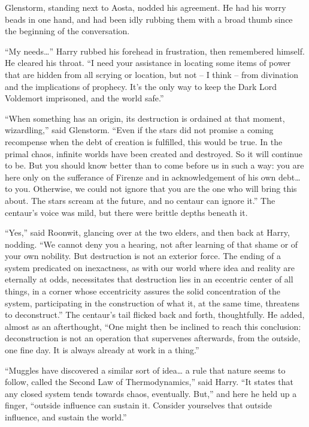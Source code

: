 Glenstorm, standing next to Aosta, nodded his agreement. He had his
worry beads in one hand, and had been idly rubbing them with a broad
thumb since the beginning of the conversation.

``My needs\ldots{}'' Harry rubbed his forehead in frustration, then
remembered himself. He cleared his throat. ``I need your assistance in
locating some items of power that are hidden from all scrying or
location, but not -- I think -- from divination and the implications of
prophecy. It's the only way to keep the Dark Lord Voldemort imprisoned,
and the world safe.''

``When something has an origin, its destruction is ordained at that
moment, wizardling,'' said Glenstorm. ``Even if the stars did not
promise a coming recompense when the debt of creation is fulfilled, this
would be true. In the primal chaos, infinite worlds have been created
and destroyed. So it will continue to be. But you should know better
than to come before us in such a way: you are here only on the
sufferance of Firenze and in acknowledgement of his own debt\ldots{} to
you. Otherwise, we could not ignore that you are the one who will bring
this about. The stars scream at the future, and no centaur can ignore
it.'' The centaur's voice was mild, but there were brittle depths
beneath it.

``Yes,'' said Roonwit, glancing over at the two elders, and then back at
Harry, nodding. ``We cannot deny you a hearing, not after learning of
that shame or of your own nobility. But destruction is not an exterior
force. The ending of a system predicated on inexactness, as with our
world where idea and reality are eternally at odds, necessitates that
destruction lies in an eccentric center of all things, in a corner whose
eccentricity assures the solid concentration of the system,
participating in the construction of what it, at the same time,
threatens to deconstruct.'' The centaur's tail flicked back and forth,
thoughtfully. He added, almost as an afterthought, ``One might then be
inclined to reach this conclusion: deconstruction is not an operation
that supervenes afterwards, from the outside, one fine day. It is always
already at work in a thing.''

``Muggles have discovered a similar sort of idea\ldots{} a rule that
nature seems to follow, called the Second Law of Thermodynamics,'' said
Harry. ``It states that any closed system tends towards chaos,
eventually. But,'' and here he held up a finger, ``outside influence can
sustain it. Consider yourselves that outside influence, and sustain the
world.''

